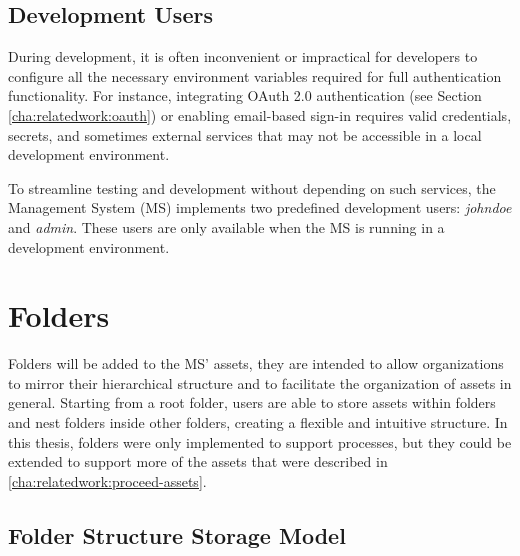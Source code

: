 \subsection{Development Users}

During development, it is often inconvenient or impractical for developers to configure all the necessary environment variables required for full authentication functionality.
For instance, integrating OAuth 2.0 authentication (see Section \ref{cha:relatedwork:oauth}) or enabling email-based sign-in requires valid credentials, secrets, and sometimes external services that may not be accessible in a local development environment.

To streamline testing and development without depending on such services,
the Management System (MS) implements two predefined development users: \textit{johndoe} and \textit{admin}.
These users are only available when the MS is running in a development environment.


%

\section{Folders}
\label{cha:conceptanddesign:folders}

Folders will be added to the MS' assets,
they are intended to allow organizations to mirror their hierarchical structure and
to facilitate the organization of assets in general.
Starting from a root folder, users are able to store assets within folders and nest
folders inside other folders, creating a flexible and intuitive structure.
In this thesis, folders were only implemented to support processes, but they could be extended to
support more of the assets that were described in \ref{cha:relatedwork:proceed-assets}.

\subsection{Folder Structure Storage Model}


